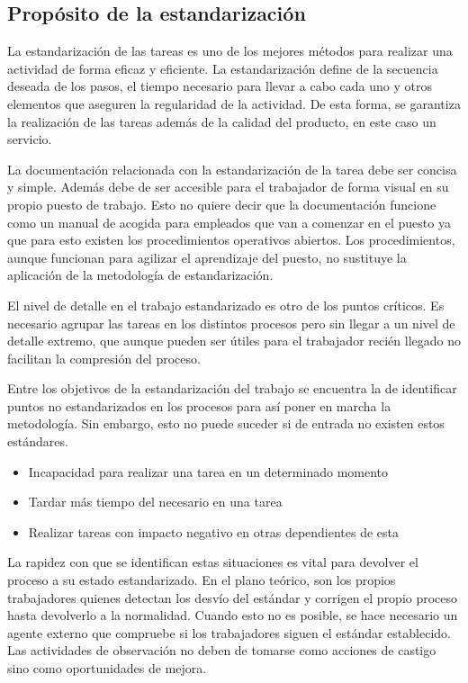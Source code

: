 \subsection{Propósito de la estandarización}

La estandarización de las tareas es uno de los mejores métodos para realizar una actividad de forma eficaz y eficiente. La estandarización define de la secuencia deseada de los pasos, el tiempo necesario para llevar a cabo cada uno y otros elementos que aseguren la regularidad de la actividad. De esta forma, se garantiza la realización de las tareas además de la calidad del producto, en este caso un servicio.

La documentación relacionada con la estandarización de la tarea debe ser concisa y simple.
Además debe de ser accesible para el trabajador de forma visual en su propio puesto de trabajo.
Esto no quiere decir que la documentación funcione como un manual de acogida para empleados que van a comenzar en el puesto ya que para esto existen los procedimientos operativos abiertos.
Los procedimientos, aunque funcionan para agilizar el aprendizaje del puesto, no sustituye la aplicación de la metodología de estandarización.

El nivel de detalle en el trabajo estandarizado es otro de los puntos críticos. Es necesario agrupar las tareas en los distintos procesos pero sin llegar a un nivel de detalle extremo, que aunque pueden ser útiles para el trabajador recién llegado no facilitan la compresión del proceso.

Entre los objetivos de la estandarización del trabajo se encuentra la de identificar puntos no estandarizados en los procesos para así poner en marcha la metodología. Sin embargo, esto no puede suceder si de entrada no existen estos estándares.

\begin{itemize}
    \item Incapacidad para realizar una tarea en un determinado momento
    \item Tardar más tiempo del necesario en una tarea
    \item Realizar tareas con impacto negativo en otras dependientes de esta
\end{itemize}

La rapidez con que se identifican estas situaciones es vital para devolver el proceso a su estado estandarizado.
En el plano teórico, son los propios trabajadores quienes detectan los desvío del estándar y corrigen el propio proceso hasta devolverlo a la normalidad.
Cuando esto no es posible, se hace necesario un agente externo que compruebe si los trabajadores siguen el estándar establecido.
Las actividades de observación no deben de tomarse como acciones de castigo sino como oportunidades de mejora.

